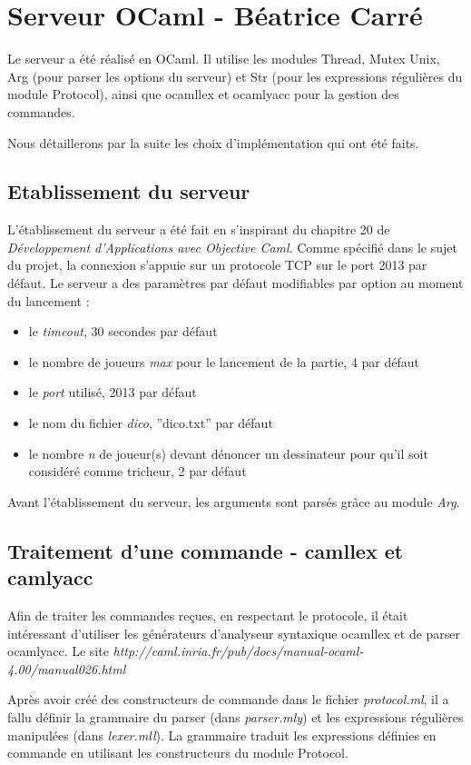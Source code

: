 \documentclass[a4paper, 11pt]{report}
\begin{document}
\chapter{Serveur OCaml - Béatrice Carré}

Le serveur a été réalisé en OCaml. Il utilise les modules Thread, Mutex
Unix, Arg (pour parser les options du serveur) et Str (pour les
expressions régulières du module Protocol), ainsi que ocamllex et
ocamlyacc pour la gestion des commandes.

Nous détaillerons par la suite les choix d'implémentation qui ont été faits.

\section{Etablissement du serveur}

L'établissement du serveur a été fait en s'inspirant du chapitre 20 de
\emph{Développement d'Applications avec Objective Caml}.
Comme spécifié dans le sujet du projet, la connexion s'appuie sur un
protocole TCP sur le port 2013 par défaut.
Le serveur a des paramètres par défaut modifiables par option au
moment du lancement :
\begin{itemize}
\item le \emph{timeout}, 30 secondes par défaut
\item le nombre de joueurs \emph{max} pour le lancement de la partie, 4 par défaut
\item le \emph{port} utilisé, 2013 par défaut
\item le nom du fichier \emph{dico}, ''dico.txt'' par défaut
\item le nombre \emph{n} de joueur(s) devant dénoncer un dessinateur pour
  qu'il soit considéré comme tricheur, 2 par défaut
\end{itemize}
Avant l'établissement du serveur, les arguments sont parsés
grâce au module \emph{Arg}.

\section{Traitement d'une commande - camllex et camlyacc}

Afin de traiter les commandes reçues, en respectant le protocole, il
était intéressant d'utiliser les générateurs d'analyseur syntaxique
ocamllex et de parser ocamlyacc. Le site \emph{http://caml.inria.fr/pub/docs/manual-ocaml-4.00/manual026.html}

Après avoir créé des constructeurs de commande dans le fichier \emph{protocol.ml}, il a
fallu définir la grammaire du parser (dans \emph{parser.mly}) et les
expressions régulières manipulées (dans \emph{lexer.mll}). La
grammaire traduit les expressions définies en commande en utilisant
les constructeurs du module Protocol.
\end{document}
